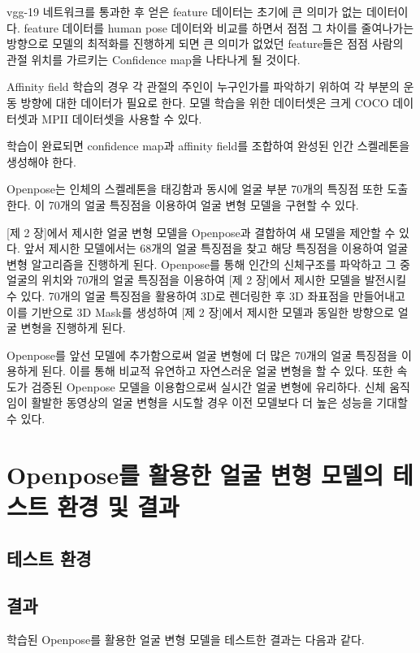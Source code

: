 vgg-19 네트워크를 통과한 후 얻은 feature 데이터는 초기에 큰 의미가 없는 데이터이다. feature 데이터를 human pose 데이터와 비교를 하면서 점점 그 차이를 줄여나가는 방향으로 모델의 최적화를 진행하게 되면 큰 의미가 없었던 feature들은 점점 사람의 관절 위치를 가르키는 Confidence map을 나타나게 될 것이다.

Affinity field 학습의 경우 각 관절의 주인이 누구인가를 파악하기 위하여 각 부분의 운동 방향에 대한 데이터가 필요로 한다. 모델 학습을 위한 데이터셋은 크게 COCO 데이터셋과 MPII 데이터셋을 사용할 수 있다.

학습이 완료되면 confidence map과 affinity field를 조합하여 완성된 인간 스켈레톤을 생성해야 한다.

Openpose는 인체의 스켈레톤을 태깅함과 동시에 얼굴 부분 70개의 특징점 또한 도출 한다. 이 70개의 얼굴 특징점을 이용하여 얼굴 변형 모델을 구현할 수 있다.

[제 2 장]에서 제시한 얼굴 변형 모델을 Openpose과 결합하여 새 모델을 제안할 수 있다. 앞서 제시한 모델에서는 68개의 얼굴 특징점을 찾고 해당 특징점을 이용하여 얼굴 변형 알고리즘을 진행하게 된다. Openpose를 통해 인간의 신체구조를 파악하고 그 중 얼굴의 위치와 70개의 얼굴 특징점을 이용하여 [제 2 장]에서 제시한 모델을 발전시킬 수 있다. 70개의 얼굴 특징점을 활용하여 3D로 렌더링한 후 3D 좌표점을 만들어내고 이를 기반으로 3D Mask를 생성하여 [제 2 장]에서 제시한 모델과 동일한 방향으로 얼굴 변형을 진행하게 된다.

Openpose를 앞선 모델에 추가함으로써 얼굴 변형에 더 많은 70개의 얼굴 특징점을 이용하게 된다. 이를 통해 비교적 유연하고 자연스러운 얼굴 변형을 할 수 있다. 또한 속도가 검증된 Openpose 모델을 이용함으로써 실시간 얼굴 변형에 유리하다. 신체 움직임이 활발한 동영상의 얼굴 변형을 시도할 경우 이전 모델보다 더 높은 성능을 기대할 수 있다.

\section{Openpose를 활용한 얼굴 변형 모델의 테스트 환경 및 결과}

\subsection{테스트 환경}
\spec
\subsection{ 결과 }

학습된 Openpose를 활용한 얼굴 변형 모델을 테스트한 결과는 다음과 같다.

